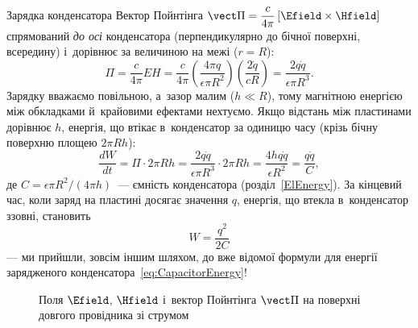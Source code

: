 \begin{Example}{Зарядка конденсатора}
	Вектор Пойнтінга $\vect\Pi=\dfrac{c}{4\pi}\left[\Efield\times\Hfield\right]$
	спрямований \emph{до осі} конденсатора (перпендикулярно до бічної поверхні,
	всередину) і~дорівнює за величиною на межі ($r=R$):
	\begin{equation*}
		\Pi = \frac{c}{4\pi}EH = \frac{c}{4\pi}\left(\frac{4\pi q}{\epsilon\pi R^2}\right)\left(\frac{2\dot q}{cR}\right) = \frac{2q\dot q}{\epsilon\pi R^3}.
	\end{equation*}
	Зарядку вважаємо повільною, а~зазор малим ($h\ll R$), тому магнітною енергією між
	обкладками й~крайовими ефектами нехтуємо. Якщо відстань між пластинами дорівнює $h$,
	енергія, що втікає в~конденсатор за одиницю часу (крізь бічну поверхню площею $2\pi
	Rh$):
	\begin{equation*}
		\frac{dW}{dt} = \Pi\cdot 2\pi Rh = \frac{2q\dot q}{\epsilon\pi R^3}\cdot 2\pi Rh = \frac{4hq\dot q}{\epsilon R^2} = \frac{q\dot q}{C},
	\end{equation*}
	де $C=\epsilon\pi R^2/(4\pi h)$~--- ємність конденсатора (розділ~\ref{ElEnergy}). За
	кінцевий час, коли заряд на пластині досягає значення $q$, енергія, що втекла
	в~конденсатор ззовні, становить
	\begin{equation}\label{eq:CapacitorEnergyResult}
		W = \frac{q^2}{2C}
	\end{equation}
	--- ми прийшли, зовсім іншим шляхом, до вже відомої формули для енергії зарядженого
	конденсатора~\eqref{eq:CapacitorEnergy}!
\end{Example}




\begin{figure}\centering
	\caption{Поля $\Efield$, $\Hfield$ і~вектор Пойнтінга $\vect\Pi$ на поверхні довгого провідника зі струмом\label{pic:WirePoynting}}
\end{figure}

